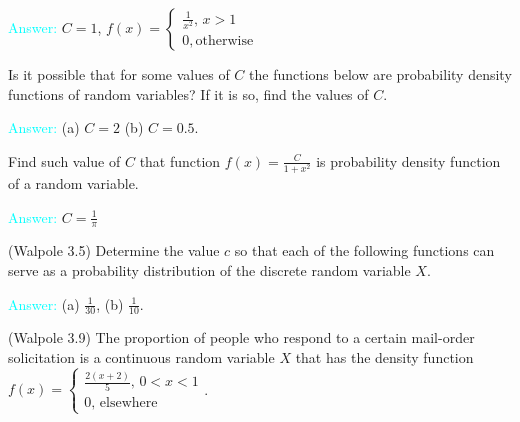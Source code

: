 \documentclass[14pt]{exam}
\begin{document}
\begin{questions}
		\textcolor{cyan}{Answer:} $C = 1$, $f(x) = \begin{cases}
			\frac{1}{x^2},\, x > 1\\
			0, \text{otherwise}
		\end{cases}$
		
		\question
		Is it possible that for some values of $C$ the functions below are probability density functions of random variables? If it is so, find the values of $C$.
		
		
		\textcolor{cyan}{Answer:} (a) $C = 2$ (b) $C = 0.5$.
		
		\question
		Find such value of $C$ that function $f(x) = \frac{C}{1 + x^2}$ is probability density function of a random variable.
		
		\textcolor{cyan}{Answer:} $C = \frac{1}{\pi}$
		
		\question
		(Walpole 3.5) Determine the value $c$ so that each of the following functions can serve as a probability distribution of
		the discrete random variable $X$.
		
		
		\textcolor{cyan}{Answer:} (a) $\frac{1}{30}$, (b) $\frac{1}{10}$.
		
		\question
		(Walpole 3.9) The proportion of people who respond to a certain mail-order solicitation is a continuous random variable $X$ that has the density function $f(x) = \begin{cases}
			\frac{2(x+2)}{5},\, 0 < x < 1\\
			0,\, \text{elsewhere}
		\end{cases}$.
		

\end{questions}
\end{document}
